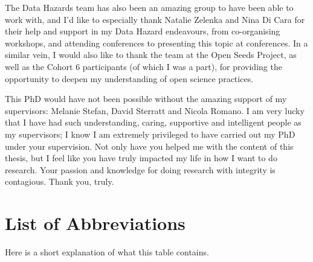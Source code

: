 \documentclass[
  11pt,
  letterpaper,
]{scrreprt}
\begin{document}
The Data Hazards team has also been an amazing group to have been able
to work with, and I'd like to especially thank Natalie Zelenka and Nina
Di Cara for their help and support in my Data Hazard endeavours, from
co-organising workshops, and attending conferences to presenting this
topic at conferences. In a similar vein, I would also like to thank the
team at the Open Seeds Project, as well as the Cohort 6 participants (of
which I was a part), for providing the opportunity to deepen my
understanding of open science practices.

This PhD would have not been possible without the amazing support of my
supervisors: Melanie Stefan, David Sterratt and Nicola Romano. I am very
lucky that I have had such understanding, caring, supportive and
intelligent people as my supervisors; I know I am extremely privileged
to have carried out my PhD under your supervision. Not only have you
helped me with the content of this thesis, but I feel like you have
truly impacted my life in how I want to do research. Your passion and
knowledge for doing research with integrity is contagious. Thank you,
truly.

\clearpage
{
\hypersetup{linkcolor=black}
\setcounter{tocdepth}{3}
\tableofcontents
\listoffigures
}


\chapter*{List of Abbreviations}\label{list-of-abbreviations}


Here is a short explanation of what this table contains.

\noindent
\end{document}
